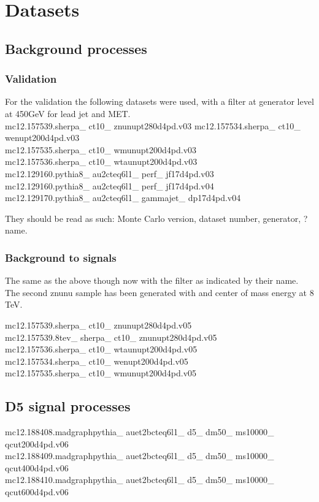 \chapter{Datasets}\label{cha:datasets}
\section{Background processes}
\subsection{Validation}
For the validation the following datasets were used, with a filter at generator level at 450GeV for lead jet and MET. \\
mc12.157539.sherpa\_ ct10\_ znunupt280d4pd.v03
mc12.157534.sherpa\_  ct10\_  wenupt200d4pd.v03\\
mc12.157535.sherpa\_  ct10\_  wmunupt200d4pd.v03\\
mc12.157536.sherpa\_  ct10\_  wtaunupt200d4pd.v03\\
mc12.129160.pythia8\_  au2cteq6l1\_  perf\_  jf17d4pd.v03\\
mc12.129160.pythia8\_  au2cteq6l1\_  perf\_  jf17d4pd.v04\\
mc12.129170.pythia8\_  au2cteq6l1\_  gammajet\_  dp17d4pd.v04

They should be read as such: Monte Carlo version, dataset number, generator, ? name.

\subsection{Background to signals}
The same as the above though now with the filter as indicated by their name. The second znunu sample has been generated with and center of mass energy at 8 TeV. 

mc12.157539.sherpa\_  ct10\_  znunupt280d4pd.v05\\
mc12.157539.8tev\_  sherpa\_  ct10\_  znunupt280d4pd.v05\\
mc12.157536.sherpa\_  ct10\_  wtaunupt200d4pd.v05\\
mc12.157534.sherpa\_  ct10\_  wenupt200d4pd.v05\\
mc12.157535.sherpa\_  ct10\_  wmunupt200d4pd.v05
\section{D5 signal processes}
mc12.188408.madgraphpythia\_  auet2bcteq6l1\_  d5\_  dm50\_  ms10000\_  \\ qcut200d4pd.v06\\
mc12.188409.madgraphpythia\_  auet2bcteq6l1\_  d5\_  dm50\_  ms10000\_  \\ qcut400d4pd.v06\\
mc12.188410.madgraphpythia\_  auet2bcteq6l1\_  d5\_  dm50\_  ms10000\_  \\ qcut600d4pd.v06

